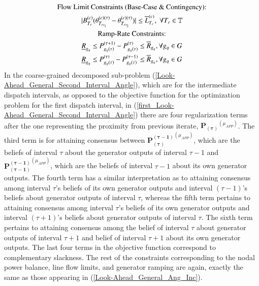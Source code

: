 \documentclass[preprint,12pt,3p]{elsarticle}
\begin{document}
\begin{subequations}
\begin{gather}
		\text{Flow Limit Constraints (Base-Case \& Contingency):}\notag\\
		|B_{T_r}^{(c)}(\theta_{{T_r}_{t_1}}^{(c)(\tau)}-\theta_{{T_r}_{t_2}}^{(c)(\tau)})|\leq{{\overline{L}}_{T_r}^{(c)}},\;\forall{T_r\in{\mathbb{T}}}\label{third1_Look-Ahead_General_Second_Interval_Angle}\\
		\text{Ramp-Rate Constraints:}\notag\\
		\underline{R}_{g_q}\leq P_{{g_q}(\tau)}^{(\tau+1)}-P_{{g_q}(\tau)}^{(\tau)}\leq \overline{R}_{g_q},\forall {g_q}\in G\label{fourth_Look-Ahead_General_Second_Interval_Angle}\\
		\underline{R}_{g_q}\leq P_{{g_q}(\tau)}^{(\tau)}-P_{{g_q}(\tau)}^{(\tau-1)}\leq \overline{R}_{g_q},\forall {g_q}\in G\label{fifth_Look-Ahead_General_Second_Interval_Angle}
		\end{gather}
	\end{subequations}
	In the coarse-grained decomposed sub-problem (\ref{Look-Ahead_General_Second_Interval_Angle}), which are for the intermediate dispatch intervals, as opposed to the objective function for the optimization problem for the first dispatch interval, in  (\ref{first_Look-Ahead_General_Second_Interval_Angle}) there are four regularization terms after the one representing the proximity from previous iterate, $\mathbf{P_{(\tau)}}^{(\mu_{APP})}$. The third term is for attaining consensus between $\mathbf{P_{(\tau)}^{(\tau-1)}}^{(\mu_{APP})}$, which are the beliefs of interval $\tau$ about the generator outputs of interval $\tau-1$ and $\mathbf{P_{(\tau-1)}^{(\tau-1)}}^{(\mu_{APP})}$, which are the beliefs of interval $\tau-1$ about its own generator outputs.  The fourth term has a similar interpretation as to attaining consensus among interval $\tau$'s beliefs of its own generator outputs and interval $(\tau-1)$'s beliefs about generator outputs of interval $\tau$, whereas the fifth term pertains to attaining consensus among interval $\tau$'s beliefs of its own generator outputs and interval $(\tau+1)$'s beliefs about generator outputs of interval $\tau$. The sixth term pertains to attaining consensus among the belief of interval $\tau$ about generator outputs of interval $\tau+1$ and belief of interval $\tau+1$ about its own generator outputs. The last four terms in the objective function correspond to complementary slackness. The rest of the constraints corresponding to the nodal power balance, line flow limits, and generator ramping are again, exactly the same as those appearing in (\ref{Look-Ahead_General_Ang_Inc}).\\
\end{document}

